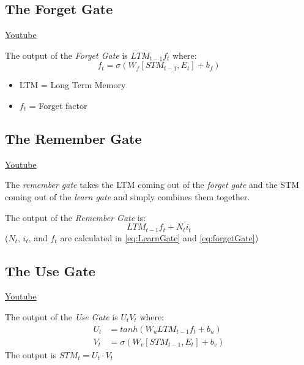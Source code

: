 \subsection{The Forget Gate}
\href{https://www.youtube.com/watch?v=iWxpfxLUPSU&ab_channel=Udacity}{Youtube} \newline

The output of the \textit{Forget Gate} is \(LTM_{t-1} f_t\) where:
\begin{equation}\label{eq:forgetGate}
    f_t = \sigma(W_f[STM_{t-1}, E_t] + b_f)
\end{equation}
\begin{itemize}
    \item LTM = Long Term Memory
    \item \(f_t\) = Forget factor
\end{itemize}

\subsection{The Remember Gate}
\href{https://www.youtube.com/watch?v=0qlm86HaXuU&ab_channel=Udacity}{Youtube} \newline

The \textit{remember gate} takes the LTM coming out of the \textit{forget gate} and the STM coming out of the \textit{learn gate} and simply combines them together. 

The output of the \textit{Remember Gate} is:
\begin{equation}
    LTM_{t-1} f_t + N_t i_t
\end{equation}
(\(N_t\), \(i_t\), and \(f_t\) are calculated in \autoref{eq:LearnGate} and \autoref{eq:forgetGate})


\subsection{The Use Gate}
\href{https://www.youtube.com/watch?v=IFBXQBfnS5g&ab_channel=Udacity}{Youtube} \newline

The output of the \textit{Use Gate} is \(U_t V_t\) where:
\begin{equation}
    \begin{split}
        U_t &= tanh(W_u LTM_{t-1} f_t + b_u) \\
        V_t &= \sigma(W_v [STM_{t-1}, E_t] + b_v)
    \end{split}
\end{equation}
The output is \(STM_t = U_t \cdot V_t\)

